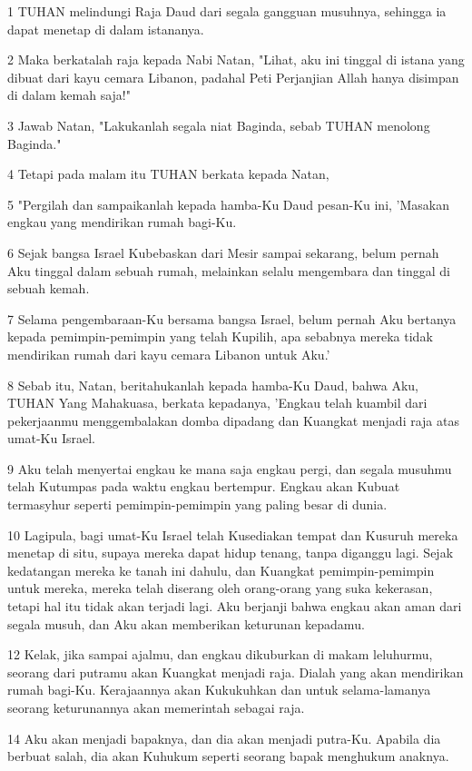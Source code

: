 \par 1 TUHAN melindungi Raja Daud dari segala gangguan musuhnya, sehingga ia dapat menetap di dalam istananya.
\par 2 Maka berkatalah raja kepada Nabi Natan, "Lihat, aku ini tinggal di istana yang dibuat dari kayu cemara Libanon, padahal Peti Perjanjian Allah hanya disimpan di dalam kemah saja!"
\par 3 Jawab Natan, "Lakukanlah segala niat Baginda, sebab TUHAN menolong Baginda."
\par 4 Tetapi pada malam itu TUHAN berkata kepada Natan,
\par 5 "Pergilah dan sampaikanlah kepada hamba-Ku Daud pesan-Ku ini, 'Masakan engkau yang mendirikan rumah bagi-Ku.
\par 6 Sejak bangsa Israel Kubebaskan dari Mesir sampai sekarang, belum pernah Aku tinggal dalam sebuah rumah, melainkan selalu mengembara dan tinggal di sebuah kemah.
\par 7 Selama pengembaraan-Ku bersama bangsa Israel, belum pernah Aku bertanya kepada pemimpin-pemimpin yang telah Kupilih, apa sebabnya mereka tidak mendirikan rumah dari kayu cemara Libanon untuk Aku.'
\par 8 Sebab itu, Natan, beritahukanlah kepada hamba-Ku Daud, bahwa Aku, TUHAN Yang Mahakuasa, berkata kepadanya, 'Engkau telah kuambil dari pekerjaanmu menggembalakan domba dipadang dan Kuangkat menjadi raja atas umat-Ku Israel.
\par 9 Aku telah menyertai engkau ke mana saja engkau pergi, dan segala musuhmu telah Kutumpas pada waktu engkau bertempur. Engkau akan Kubuat termasyhur seperti pemimpin-pemimpin yang paling besar di dunia.
\par 10 Lagipula, bagi umat-Ku Israel telah Kusediakan tempat dan Kusuruh mereka menetap di situ, supaya mereka dapat hidup tenang, tanpa diganggu lagi. Sejak kedatangan mereka ke tanah ini dahulu, dan Kuangkat pemimpin-pemimpin untuk mereka, mereka telah diserang oleh orang-orang yang suka kekerasan, tetapi hal itu tidak akan terjadi lagi. Aku berjanji bahwa engkau akan aman dari segala musuh, dan Aku akan memberikan keturunan kepadamu.
\par 12 Kelak, jika sampai ajalmu, dan engkau dikuburkan di makam leluhurmu, seorang dari putramu akan Kuangkat menjadi raja. Dialah yang akan mendirikan rumah bagi-Ku. Kerajaannya akan Kukukuhkan dan untuk selama-lamanya seorang keturunannya akan memerintah sebagai raja.
\par 14 Aku akan menjadi bapaknya, dan dia akan menjadi putra-Ku. Apabila dia berbuat salah, dia akan Kuhukum seperti seorang bapak menghukum anaknya.
